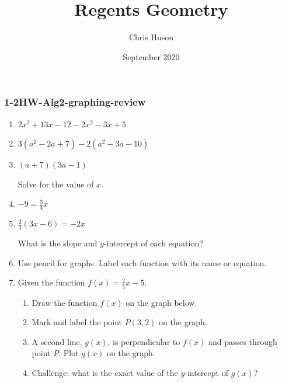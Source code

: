 \documentclass[12pt, twoside]{article}
\title{Regents Geometry}
\author{Chris Huson}
\date{September 2020}
\begin{document}
\subsubsection*{1-2HW-Alg2-graphing-review}
\begin{enumerate}
\item $2x^2+13x -12 -2x^2-3x+5$ \vspace{3cm}
\item $3(a^2-2a +7) -2(a^2-3a-10)$ \vspace{5cm}
\item $(a +7)(3a-1)$ \vspace{3cm}


Solve for the value of $x$.
\item   $-9= \frac{3}{4}x$ \vspace{3cm}
\item   $\frac{2}{3}(3x-6)=-2x$ \vspace{3cm}

\newpage
What is the slope and $y$-intercept of each equation?
\item   {} \vspace{3cm}

Use pencil for graphs. Label each function with its name or equation.
\item Given the function $f(x)=\frac{2}{5}x-5$.
\begin{enumerate}
    \item Draw the function $f(x)$ on the graph below.
    \item Mark and label the point $P (3, 2)$ on the graph.
    \item A second line, $g(x)$, is perpendicular to $f(x)$ and passes through point $P$. Plot $g(x)$ on the graph.
    \item Challenge: what is the exact value of the $y$-intercept of $g(x)$?
\end{enumerate}


\end{enumerate}
\end{document}
